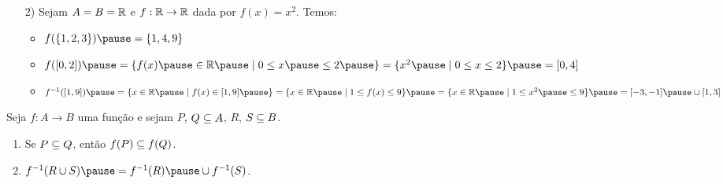 \documentclass{beamer}
\begin{document}
    \begin{frame}
        \begin{exemplos}
            \begin{enumerate}
                \item[2)] Sejam $A = B = \mathbb{R}$ \pause e $f : \mathbb{R} \to \mathbb{R}$ \pause dada por $f(x) = x^2$. \pause Temos:\pause

                \vspace{.5cm}

                \begin{itemize}
                    \item $f(\{1, 2, 3\}) \pause = \{1, 4, 9\}$\pause

                    \vspace{.5cm}

                    \item $f([0,2]) \pause = \{f(x) \pause \in \real \pause \mid 0 \le x \pause \le 2 \pause \} = \{x^2 \pause \mid 0 \le x \le 2\} \pause = [0, 4]$\pause

                    \vspace{.5cm}

                    \item $f^{-1}([1, 9]) \pause = \{x \in \real \pause \mid f(x) \in [1, 9]\pause \} = \{ x \in \real \pause \mid 1 \le f(x) \le 9\} \pause = \{x \in \real \pause \mid 1 \le x^2 \pause \le 9\} \pause = [-3, -1] \pause \cup [1, 3]$\pause

                    \vspace{.5cm}
                \end{itemize}
            \end{enumerate}
        \end{exemplos}
    \end{frame}

    \begin{frame}
        \begin{proposicao}
            Seja $f : A \to B$ uma fun{\c c}{\~a}o \pause e sejam $P$, \pause $Q \subseteq A$, \pause $R$, \pause $S \subseteq B$.\pause
            \begin{enumerate}[label={\roman*})]
                \item Se $P \subseteq Q$, \pause ent{\~a}o $f(P) \subseteq f(Q)$.\pause

                \vspace{.5cm}

                \item $f^{-1}(R \cup S) \pause = f^{-1}(R) \pause \cup f^{-1}(S)$.\pause
            \end{enumerate}
        \end{proposicao}
    \end{frame}
\end{document}
